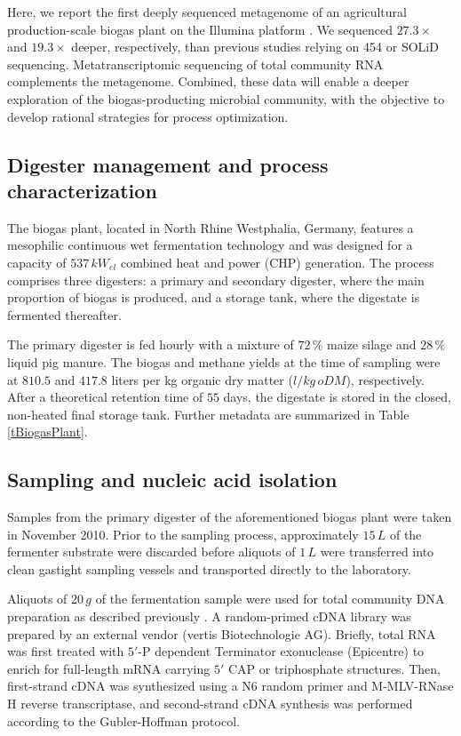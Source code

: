 \documentclass{bmcart}
\begin{document}
Here, we report the first deeply sequenced metagenome of an agricultural production-scale biogas plant on the Illumina platform \cite{GigaDB}.
We sequenced $27.3 \times$ and $19.3 \times$ deeper, respectively, than previous studies relying on 454 \cite{Jaenicke2011} or SOLiD \cite{Wirth2012} sequencing. Metatranscriptomic sequencing of total community RNA complements the metagenome.
Combined, these data will enable a deeper exploration of the biogas-producting microbial community, with the objective to develop rational strategies for process optimization.

\subsection*{Digester management and process characterization}
The biogas plant, located in North Rhine Westphalia, Germany, features a mesophilic continuous wet fermentation technology and was designed for a capacity of $537\,kW_{el}$ combined heat and power (CHP) generation.
The process comprises three digesters: a primary and secondary digester, where the main proportion of biogas is produced, and a storage tank, where the digestate is fermented thereafter.

The primary digester is fed hourly with a mixture of $72\,\%$ maize silage and $28\,\%$ liquid pig manure.
The biogas and methane yields at the time of sampling were at $810.5$ and $417.8$ liters per kg organic dry matter ($l / kg\,oDM$), respectively.
After a theoretical retention time of $55$ days, the digestate is stored in the closed, non-heated final storage tank.
Further metadata are summarized in Table \ref{tBiogasPlant}.

\subsection*{Sampling and nucleic acid isolation}
Samples from the primary digester of the aforementioned biogas plant were taken in November 2010.
Prior to the sampling process, approximately $15\,L$ of the fermenter substrate were discarded before aliquots of $1\,L$ were transferred into clean gastight sampling vessels and transported directly to the laboratory.

Aliquots of $20\,g$ of the fermentation sample were used for total community DNA preparation as described previously \cite{Schlueter2008}. A random-primed cDNA library was prepared by an external vendor (vertis Biotechnologie AG). Briefly, total RNA was first treated with $5'$-P dependent Terminator exonuclease (Epicentre) to enrich for full-length mRNA carrying $5'$ CAP or triphosphate structures. Then, first-strand cDNA was synthesized using a N6 random primer and M-MLV-RNase H reverse transcriptase, and second-strand cDNA synthesis was performed according to the Gubler-Hoffman protocol.
\end{document}
